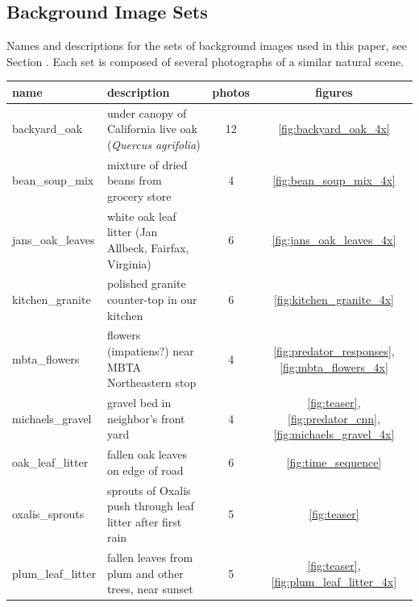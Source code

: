 \documentclass[letterpaper]{article}
\begin{document}
\subsection{Background Image Sets}
\begin{minipage}{\linewidth}
Names and descriptions for the sets of background images used in this paper, see Section . Each set is composed of several photographs of a similar natural scene.
\par
\begin{table}[H]
    \footnotesize
    \raggedright 
    \begin{tabular}{ |l|l|c|c| }
        \hline
        \textbf{name} & \textbf{description} & \textbf{photos} & \textbf{figures} \\ 
        \hline
        backyard\_oak &
            under canopy of California live oak (\textit{Quercus agrifolia}) &
            12 & \ref{fig:backyard_oak_4x} \\
        \hline
        bean\_soup\_mix &
            mixture of dried beans from grocery store &
            4 & \ref{fig:bean_soup_mix_4x} \\
        \hline
        jans\_oak\_leaves &
            white oak leaf litter (Jan Allbeck, Fairfax, Virginia) &
            6 & \ref{fig:jans_oak_leaves_4x} \\
        \hline
        kitchen\_granite &
            polished granite counter-top in our kitchen &
            6 & \ref{fig:kitchen_granite_4x} \\
        \hline
        mbta\_flowers &
            flowers (impatiens?) near MBTA Northeastern stop &
            4 & \ref{fig:predator_responses}, \ref{fig:mbta_flowers_4x} \\
        \hline
        michaels\_gravel &
            gravel bed in neighbor’s front yard &
            4 & \ref{fig:teaser}, \ref{fig:predator_cnn}, \ref{fig:michaels_gravel_4x} \\
        \hline
        oak\_leaf\_litter &
            fallen oak leaves on edge of road &
            6 & \ref{fig:time_sequence} \\
        \hline
        oxalis\_sprouts &
            sprouts of Oxalis push through leaf litter after first rain &
            5 & \ref{fig:teaser} \\
        \hline
        plum\_leaf\_litter &
            fallen leaves from plum and other trees, near sunset &
            5 & \ref{fig:teaser}, \ref{fig:plum_leaf_litter_4x} \\

\end{tabular}
\end{table}
\end{minipage}
\end{document}
